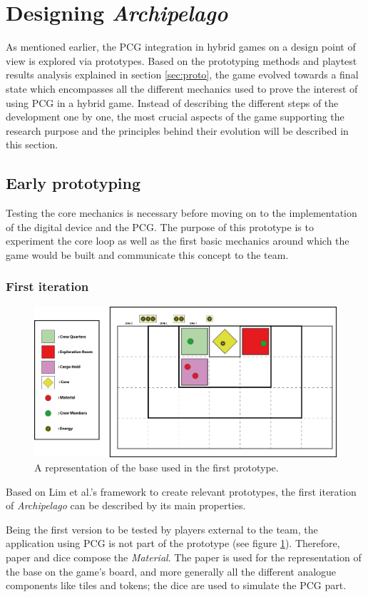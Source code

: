 \section{Designing \textit{Archipelago}}
As mentioned earlier, the PCG integration in hybrid games on a design point of view is explored via prototypes. Based on the prototyping methods and playtest results analysis explained in section \ref{sec:proto}, the game evolved towards a final state which encompasses all the different mechanics used to prove the interest of using PCG in a hybrid game. Instead of describing the different steps of the development one by one, the most crucial aspects of the game supporting the research purpose and the principles behind their evolution will be described in this section.  
\subsection{Early prototyping}
Testing the core mechanics is necessary before moving on to the implementation of the digital device and the PCG. The purpose of this prototype is to experiment the core loop as well as the first basic mechanics around which the game would be built and communicate this concept to the team.
\subsubsection{First iteration}
\begin{figure}[!ht]
    \centering
    \includegraphics[scale=0.5]{Images/Board1.png}
    \caption{A representation of the base used in the first prototype.}
    \label{fig:base1}
\end{figure}
Based on Lim et al.'s framework to create relevant prototypes, the first iteration of \textit{Archipelago} can be described by its main properties.

Being the first version to be tested by players external to the team, the application using PCG is not part of the prototype (see figure \ref{fig:base1}). Therefore, paper and dice compose the \textit{Material}. The paper is used for the representation of the base on the game's board, and more generally all the different analogue components like tiles and tokens; the dice are used to simulate the PCG part. 

